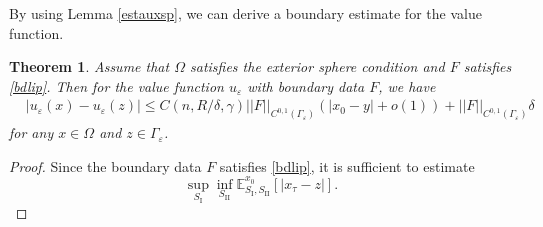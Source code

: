 \documentclass[english]{amsart}
\newcommand{\eps}{\varepsilon}
\theoremstyle{plain}
\newtheorem{theorem}[definition]{Theorem}
\theoremstyle{definition}
\theoremstyle{remark}
\numberwithin{equation}{section}
\begin{document}
By using Lemma \ref{estauxsp}, we can derive a boundary estimate for the value function.
\begin{theorem}\label{bdes}
Assume that $\Omega$ satisfies the exterior sphere condition and $F$ satisfies \eqref{bdlip}.
Then for the value function $u_{\eps}$ with boundary data $F$, we have
\begin{align}\label{nearbd} 
& |u_{\eps}(x)-u_{\eps}(z)|  \le C(n,  R/\delta, \gamma)||F||_{C^{0,1}(\Gamma_{\eps})}( |x_0-y|+o(1)) +||F||_{C^{0,1}(\Gamma_{\eps})}\delta
\end{align} 
for any $x\in\Omega$ and $z\in \Gamma_{\eps}$.
\end{theorem}
\begin{proof}Since the boundary data $F$ satisfies \eqref{bdlip}, it is sufficient to estimate 
$$ \sup_{S_{\textrm{I}}}\inf_{S_{\textrm{II}}}\mathbb{E}_{S_{\textrm{I}},S_{\textrm{II}}}^{x_0}[|x_{\tau}-z|].$$


\end{proof}
\end{document}

